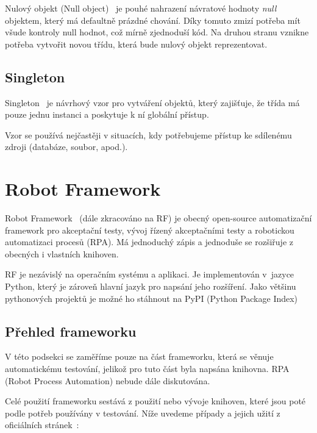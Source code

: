Nulový objekt (Null object)~\cite{NullObject} je pouhé nahrazení návratové hodnoty \textit{null} objektem, který má defaultně prázdné chování. Díky tomuto zmizí potřeba mít všude kontroly null hodnot, což mírně zjednoduší kód. Na druhou stranu vznikne potřeba vytvořit novou třídu, která bude nulový objekt reprezentovat.

\subsection{Singleton}
\label{singleton}

Singleton~\cite{Singleton} je návrhový vzor pro vytváření objektů, který zajišťuje, že třída má pouze jednu instanci a poskytuje k ní globální přístup.

Vzor se používá nejčastěji v situacích, kdy potřebujeme přístup ke sdílenému zdroji (databáze, soubor, apod.).

\section{Robot Framework}
\label{sec:RF}

Robot Framework~\cite{robotframeworkGH} (dále zkracováno na RF) je obecný open-source automatizační framework pro akceptační testy, vývoj řízený akceptačními testy a robotickou automatizaci procesů (RPA). Má jednoduchý zápis a jednoduše se rozšiřuje z obecných i vlastních knihoven.

RF je nezávislý na operačním systému a aplikaci. Je implementován v~jazyce Python, který je zároveň hlavní jazyk pro napsání jeho rozšíření. Jako většinu pythonových projektů je možné ho stáhnout na PyPI (Python Package Index)

\subsection{Přehled frameworku}

V této podsekci se zaměříme pouze na část frameworku, která se věnuje automatickému testování, jelikož pro tuto část byla napsána knihovna. RPA (Robot Process Automation) nebude dále diskutována.

Celé použití frameworku sestává z použití nebo vývoje knihoven, které jsou poté podle potřeb používány v testování. Níže uvedeme případy a jejich užití z oficiálních stránek~\cite{robotframeworkOverview}: 

